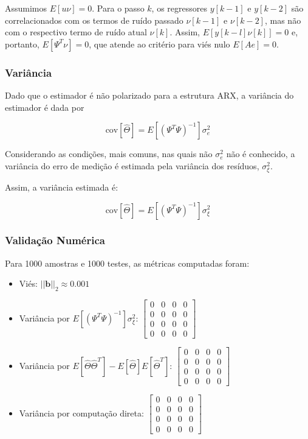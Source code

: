 \documentclass{article}
\begin{document}
Assumimos $E[u\nu] = 0$. Para o passo $k$, os regressores $y[k - 1]$ e $y[k - 2]$ são correlacionados com os termos de ruído passado $\nu[k - 1]$ e $\nu[k - 2]$, mas não com o respectivo termo de ruído atual $\nu[k]$. Assim, $E[y[k - l]\nu[k]] = 0$ e, portanto, $E[\Psi^T\nu] = 0$, que atende ao critério para viés nulo $E[Ae] = 0$.

\subsubsection*{Variância}

Dado que o estimador é não polarizado para a estrutura ARX, a variância do estimador é dada por

\begin{equation*}
\text{cov}[\hat{\Theta}] = E[(\Psi^{T}\Psi)^{-1}]\sigma_e^2
\end{equation*}

Considerando as condições, mais comuns, nas quais não $\sigma_e^2$ não é conhecido, a variância do erro de medição é estimada pela variância dos resíduos, $\sigma_\xi^2$.

Assim, a variância estimada é:

\begin{equation*}
\text{cov}[\hat{\Theta}] = E[(\Psi^{T}\Psi)^{-1}]\sigma_\xi^2
\end{equation*}

\subsubsection*{Validação Numérica}

Para 1000 amostras e 1000 testes, as métricas computadas foram:

\begin{itemize}
    \item Viés: $||\boldsymbol{b}||_2 \approx 0.001$
    \item Variância por $E[(\Psi^{T}\Psi)^{-1}]\sigma_\xi^2$: $\begin{bmatrix} 0 & 0 & 0 & 0 \\ 0 & 0 & 0 & 0 \\ 0 & 0 & 0 & 0 \\ 0 & 0 & 0 & 0 \end{bmatrix}$
    \item Variância por $E[\hat{\Theta}\hat{\Theta}^T] - E[\hat{\Theta}]E[\hat{\Theta}^T]$: $\begin{bmatrix} 0 & 0 & 0 & 0 \\ 0 & 0 & 0 & 0 \\ 0 & 0 & 0 & 0 \\ 0 & 0 & 0 & 0 \end{bmatrix}$
    \item Variância por computação direta: $\begin{bmatrix} 0 & 0 & 0 & 0 \\ 0 & 0 & 0 & 0 \\ 0 & 0 & 0 & 0 \\ 0 & 0 & 0 & 0 \end{bmatrix}$
\end{itemize}
\end{document}

